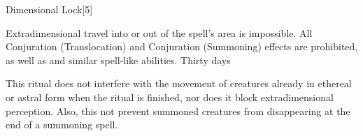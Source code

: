 \begin{spellsection}{Dimensional Lock}[5]
    \begin{spellheader}
    \end{spellheader}
    \begin{spellcontent}
        \begin{spelltargetinginfo}
        \end{spelltargetinginfo}
        \begin{spelleffects}

            \spellline
            \spelleffect Extradimensional travel into or out of the spell's area is impossible. All Conjuration (Translocation) and Conjuration (Summoning) effects are prohibited, as well as  and similar spell-like abilities.
            \spelldur Thirty days
        \end{spelleffects}
    \end{spellcontent}
    \begin{spellfooter}
        \spellnotes This ritual does not interfere with the movement of creatures already in ethereal or astral form when the ritual is finished, nor does it block extradimensional perception. Also, this not prevent summoned creatures from disappearing at the end of a summoning spell.
    \end{spellfooter}
\end{spellsection}

